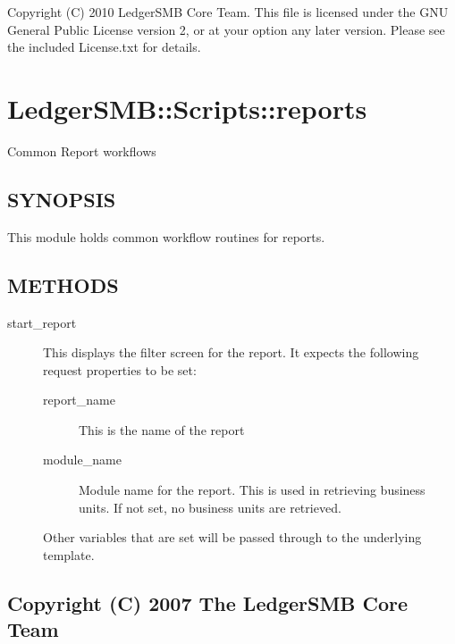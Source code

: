 \begin{description}
Copyright (C) 2010 LedgerSMB Core Team.  This file is licensed under the GNU 
General Public License version 2, or at your option any later version.  Please
see the included License.txt for details.

\section{LedgerSMB::Scripts::reports\label{LedgerSMB::Scripts::reports}}


Common Report workflows

\subsection*{SYNOPSIS\label{LedgerSMB::Scripts::reports_SYNOPSIS}}


This module holds common workflow routines for reports.

\subsection*{METHODS\label{LedgerSMB::Scripts::reports_METHODS}}
\begin{description}

\item[{start\_report}] \mbox{}

This displays the filter screen for the report.  It expects the following 
request properties to be set:

\begin{description}

\item[{report\_name}] \mbox{}

This is the name of the report


\item[{module\_name}] \mbox{}

Module name for the report.  This is used in retrieving business units.  If not
set, no business units are retrieved.

\end{description}


Other variables that are set will be passed through to the underlying template.

\end{description}
\subsection*{Copyright (C) 2007 The LedgerSMB Core Team\label{LedgerSMB::Scripts::reports_Copyright_C_2007_The_LedgerSMB_Core_Team}}



\end{description}
